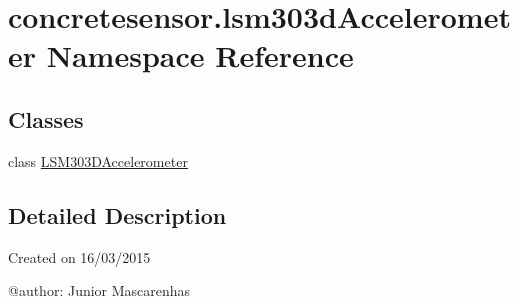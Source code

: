 \hypertarget{namespaceconcretesensor_1_1lsm303dAccelerometer}{}\section{concretesensor.\+lsm303d\+Accelerometer Namespace Reference}
\label{namespaceconcretesensor_1_1lsm303dAccelerometer}
\subsection*{Classes}
\begin{DoxyCompactItemize}
\item 
class \hyperlink{classconcretesensor_1_1lsm303dAccelerometer_1_1LSM303DAccelerometer}{L\+S\+M303\+D\+Accelerometer}
\end{DoxyCompactItemize}


\subsection{Detailed Description}
\begin{DoxyVerb}Created on 16/03/2015

@author: Junior Mascarenhas
\end{DoxyVerb}
 